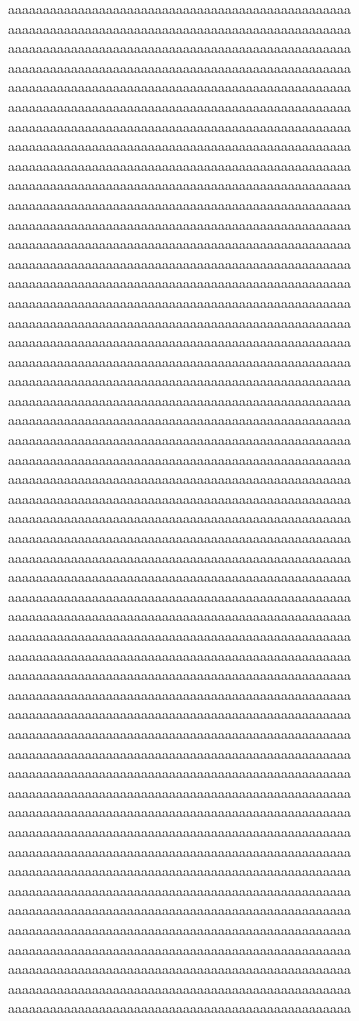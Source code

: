 aaaaaaaaaaaaaaaaaaaaaaaaaaaaaaaaaaaaaaaaaaaaaaaaa
aaaaaaaaaaaaaaaaaaaaaaaaaaaaaaaaaaaaaaaaaaaaaaaaa
aaaaaaaaaaaaaaaaaaaaaaaaaaaaaaaaaaaaaaaaaaaaaaaaa
aaaaaaaaaaaaaaaaaaaaaaaaaaaaaaaaaaaaaaaaaaaaaaaaa
aaaaaaaaaaaaaaaaaaaaaaaaaaaaaaaaaaaaaaaaaaaaaaaaa
aaaaaaaaaaaaaaaaaaaaaaaaaaaaaaaaaaaaaaaaaaaaaaaaa
aaaaaaaaaaaaaaaaaaaaaaaaaaaaaaaaaaaaaaaaaaaaaaaaa
aaaaaaaaaaaaaaaaaaaaaaaaaaaaaaaaaaaaaaaaaaaaaaaaa
aaaaaaaaaaaaaaaaaaaaaaaaaaaaaaaaaaaaaaaaaaaaaaaaa
aaaaaaaaaaaaaaaaaaaaaaaaaaaaaaaaaaaaaaaaaaaaaaaaa
aaaaaaaaaaaaaaaaaaaaaaaaaaaaaaaaaaaaaaaaaaaaaaaaa
aaaaaaaaaaaaaaaaaaaaaaaaaaaaaaaaaaaaaaaaaaaaaaaaa
aaaaaaaaaaaaaaaaaaaaaaaaaaaaaaaaaaaaaaaaaaaaaaaaa
aaaaaaaaaaaaaaaaaaaaaaaaaaaaaaaaaaaaaaaaaaaaaaaaa
aaaaaaaaaaaaaaaaaaaaaaaaaaaaaaaaaaaaaaaaaaaaaaaaa
aaaaaaaaaaaaaaaaaaaaaaaaaaaaaaaaaaaaaaaaaaaaaaaaa
aaaaaaaaaaaaaaaaaaaaaaaaaaaaaaaaaaaaaaaaaaaaaaaaa
aaaaaaaaaaaaaaaaaaaaaaaaaaaaaaaaaaaaaaaaaaaaaaaaa
aaaaaaaaaaaaaaaaaaaaaaaaaaaaaaaaaaaaaaaaaaaaaaaaa
aaaaaaaaaaaaaaaaaaaaaaaaaaaaaaaaaaaaaaaaaaaaaaaaa
aaaaaaaaaaaaaaaaaaaaaaaaaaaaaaaaaaaaaaaaaaaaaaaaa
aaaaaaaaaaaaaaaaaaaaaaaaaaaaaaaaaaaaaaaaaaaaaaaaa
aaaaaaaaaaaaaaaaaaaaaaaaaaaaaaaaaaaaaaaaaaaaaaaaa
aaaaaaaaaaaaaaaaaaaaaaaaaaaaaaaaaaaaaaaaaaaaaaaaa
aaaaaaaaaaaaaaaaaaaaaaaaaaaaaaaaaaaaaaaaaaaaaaaaa
aaaaaaaaaaaaaaaaaaaaaaaaaaaaaaaaaaaaaaaaaaaaaaaaa
aaaaaaaaaaaaaaaaaaaaaaaaaaaaaaaaaaaaaaaaaaaaaaaaa
aaaaaaaaaaaaaaaaaaaaaaaaaaaaaaaaaaaaaaaaaaaaaaaaa
aaaaaaaaaaaaaaaaaaaaaaaaaaaaaaaaaaaaaaaaaaaaaaaaa
aaaaaaaaaaaaaaaaaaaaaaaaaaaaaaaaaaaaaaaaaaaaaaaaa
aaaaaaaaaaaaaaaaaaaaaaaaaaaaaaaaaaaaaaaaaaaaaaaaa
aaaaaaaaaaaaaaaaaaaaaaaaaaaaaaaaaaaaaaaaaaaaaaaaa
aaaaaaaaaaaaaaaaaaaaaaaaaaaaaaaaaaaaaaaaaaaaaaaaa
aaaaaaaaaaaaaaaaaaaaaaaaaaaaaaaaaaaaaaaaaaaaaaaaa
aaaaaaaaaaaaaaaaaaaaaaaaaaaaaaaaaaaaaaaaaaaaaaaaa
aaaaaaaaaaaaaaaaaaaaaaaaaaaaaaaaaaaaaaaaaaaaaaaaa
aaaaaaaaaaaaaaaaaaaaaaaaaaaaaaaaaaaaaaaaaaaaaaaaa
aaaaaaaaaaaaaaaaaaaaaaaaaaaaaaaaaaaaaaaaaaaaaaaaa
aaaaaaaaaaaaaaaaaaaaaaaaaaaaaaaaaaaaaaaaaaaaaaaaa
aaaaaaaaaaaaaaaaaaaaaaaaaaaaaaaaaaaaaaaaaaaaaaaaa
aaaaaaaaaaaaaaaaaaaaaaaaaaaaaaaaaaaaaaaaaaaaaaaaa
aaaaaaaaaaaaaaaaaaaaaaaaaaaaaaaaaaaaaaaaaaaaaaaaa
aaaaaaaaaaaaaaaaaaaaaaaaaaaaaaaaaaaaaaaaaaaaaaaaa
aaaaaaaaaaaaaaaaaaaaaaaaaaaaaaaaaaaaaaaaaaaaaaaaa
aaaaaaaaaaaaaaaaaaaaaaaaaaaaaaaaaaaaaaaaaaaaaaaaa
aaaaaaaaaaaaaaaaaaaaaaaaaaaaaaaaaaaaaaaaaaaaaaaaa
aaaaaaaaaaaaaaaaaaaaaaaaaaaaaaaaaaaaaaaaaaaaaaaaa
aaaaaaaaaaaaaaaaaaaaaaaaaaaaaaaaaaaaaaaaaaaaaaaaa
aaaaaaaaaaaaaaaaaaaaaaaaaaaaaaaaaaaaaaaaaaaaaaaaa
aaaaaaaaaaaaaaaaaaaaaaaaaaaaaaaaaaaaaaaaaaaaaaaaa
aaaaaaaaaaaaaaaaaaaaaaaaaaaaaaaaaaaaaaaaaaaaaaaaa
aaaaaaaaaaaaaaaaaaaaaaaaaaaaaaaaaaaaaaaaaaaaaaaaa
